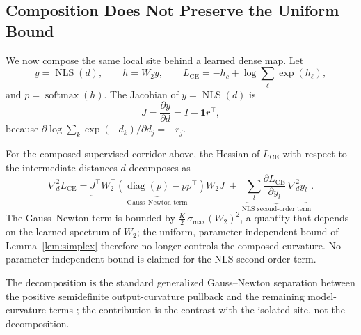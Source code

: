 \subsection{Composition Does Not Preserve the Uniform Bound}
We now compose the same local site behind a learned dense map. Let
\[
    y = \operatorname{NLS}(d),
    \qquad
    h = W_2y,
    \qquad
    L_{\mathrm{CE}} = -h_c + \log\sum_{\ell}\exp(h_\ell),
\]
and $p=\operatorname{softmax}(h)$. The Jacobian of
$y=\operatorname{NLS}(d)$ is
\[
    J = \frac{\partial y}{\partial d}
      = I - \mathbf{1}r^\top,
\]
because $\partial \log \sum_k \exp(-d_k)/\partial d_j=-r_j$.
\begin{proposition}
\label{prop:composition}
For the composed supervised corridor above, the Hessian of $L_{\mathrm{CE}}$
with respect to the intermediate distances $d$ decomposes as
\[
    \nabla_d^2 L_{\mathrm{CE}}
    =
    \underbrace{J^\top W_2^\top
    \left(\operatorname{diag}(p)-pp^\top\right)
    W_2J}_{\text{Gauss--Newton term}}
    \;+\;
    \underbrace{\sum_{l}\frac{\partial L_{\mathrm{CE}}}{\partial y_l}\,
    \nabla_d^2 y_l}_{\text{NLS second-order term}}.
\]
The Gauss--Newton term is bounded by $\tfrac{K}{2}\,\sigma_{\max}(W_2)^2$, a
quantity that depends on the learned spectrum of $W_2$; the uniform,
parameter-independent bound of Lemma~\ref{lem:simplex} therefore no longer
controls the composed curvature. No parameter-independent bound is claimed for
the NLS second-order term.
\end{proposition}
The decomposition is the standard generalized Gauss--Newton separation between
the positive semidefinite output-curvature pullback and the remaining
model-curvature terms \citep{schraudolph2002fast,martens2010deep}; the
contribution is the contrast with the isolated site, not the decomposition.
